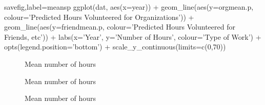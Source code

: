 \documentclass{article}
\begin{document}
\begin{Rcode}{savefig,label=meansp}
ggplot(dat, aes(x=year)) +
geom_line(aes(y=orgmean.p, colour='Predicted Hours Volunteered for Organizations')) +
geom_line(aes(y=friendmean.p, colour='Predicted Hours Volunteered for Friends, etc')) + 
labs(x='Year', y='Number of Hours', colour='Type of Work') + opts(legend.position='bottom') +
scale_y_continuous(limits=c(0,70))
\end{Rcode}


\begin{figure}[ht]
\centering
{}
\caption{Mean number of hours}
\end{figure}

\begin{figure}[ht]
\centering
{}
\caption{Mean number of hours}
\end{figure}

\begin{figure}[ht]
\centering
{}
\caption{Mean number of hours}
\end{figure}
\end{document}
